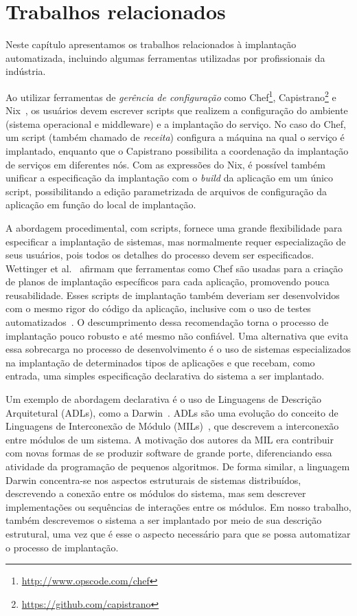 
\chapter{Trabalhos relacionados}
\label{cap:relacionados}

Neste capítulo apresentamos os trabalhos relacionados à implantação automatizada,
incluindo algumas ferramentas utilizadas por profissionais da indústria.

Ao utilizar ferramentas de \emph{gerência de configuração} como Chef\footnote{\url{http://www.opscode.com/chef}}, Capistrano\footnote{\url{https://github.com/capistrano}} e Nix~\cite{Dolstra2005Configuration}, os usuários devem escrever scripts que realizem a configuração do ambiente (sistema operacional e middleware) e a implantação do serviço. No caso do Chef, um script (também chamado de \emph{receita}) configura a máquina na qual o serviço é implantado, enquanto que o Capistrano possibilita a coordenação da implantação de serviços em diferentes nós. Com as expressões do Nix, é possível também unificar a especificação da implantação com o \textit{build} da aplicação em um único script, possibilitando a edição parametrizada de arquivos de configuração da aplicação em função do local de implantação. 

A abordagem procedimental, com scripts, fornece uma grande 
flexibilidade para especificar a implantação de sistemas, 
mas normalmente requer especialização de seus usuários, 
pois todos os detalhes do processo devem ser especificados. 
Wettinger et al.~\cite{Wettinger2013ExtensiblePaaS} 
afirmam que ferramentas como Chef são usadas
para a criação de planos de implantação específicos para cada aplicação,
promovendo pouca reusabilidade.
Esses scripts de implantação também deveriam ser desenvolvidos 
com o mesmo rigor do código da aplicação, inclusive com o uso 
de testes automatizados~\cite{Humble2011Continuous}. 
O descumprimento dessa recomendação torna o processo de implantação 
pouco robusto e até mesmo não confiável. Uma alternativa que evita 
essa sobrecarga no processo de desenvolvimento é o uso de sistemas 
especializados na implantação de determinados tipos de aplicações e que recebam, 
como entrada, uma simples especificação declarativa do sistema a ser implantado.

Um exemplo de abordagem declarativa é o uso de Linguagens de Descrição Arquitetural (ADLs), como a Darwin~\cite{Magee1996Dynamic}. ADLs são uma evolução do conceito de Linguagens de Interconexão de Módulo (MILs)~\cite{DeRemer1976Programming}, que descrevem a interconexão entre módulos de um sistema. A motivação dos autores da MIL era contribuir com novas formas de se produzir software de grande porte, diferenciando essa atividade da programação de pequenos algoritmos. De forma similar, a linguagem Darwin concentra-se nos aspectos estruturais de sistemas distribuídos, descrevendo a conexão entre os módulos do sistema, mas sem descrever implementações ou sequências de interações entre os módulos. Em nosso trabalho, também descrevemos o sistema a ser implantado por meio de sua descrição estrutural, uma vez que é esse o aspecto necessário para que se possa automatizar o processo de implantação. 

